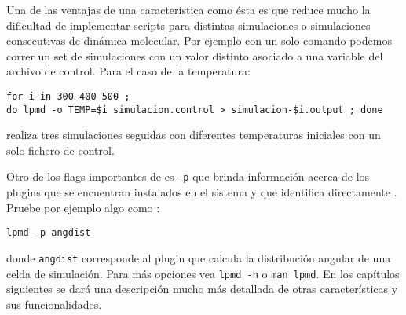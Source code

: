Una de las ventajas de una caracter\'istica como \'esta es que reduce mucho la dificultad de implementar scripts para distintas simulaciones o simulaciones consecutivas de din\'amica molecular. Por ejemplo con un solo comando podemos correr un set de simulaciones con un valor distinto asociado a una variable del archivo de control. Para el caso de la temperatura:

\begin{center}
 \texttt{for i in 300 400 500 ; \\do lpmd -o TEMP=\$i simulacion.control > simulacion-\$i.output ; done}
\end{center}
\noindent
realiza tres simulaciones seguidas con diferentes temperaturas iniciales con un solo fichero de control.


Otro de los flags importantes de {\lpmd} es \verb|-p| que brinda informaci\'on acerca de los plugins que se encuentran instalados en el sistema y que identifica directamente {\lpmd}. Pruebe por ejemplo algo como :

\begin{center}
 \texttt{lpmd -p angdist}
\end{center}
\noindent
donde \verb|angdist| corresponde al plugin que calcula la distribuci\'on angular de una celda de simulaci\'on. Para m\'as opciones vea \verb|lpmd -h| o \verb|man lpmd|. En los cap\'itulos siguientes se dar\'a una descripci\'on mucho m\'as detallada de otras caracter\'isticas {\lpmd} y sus funcionalidades.

